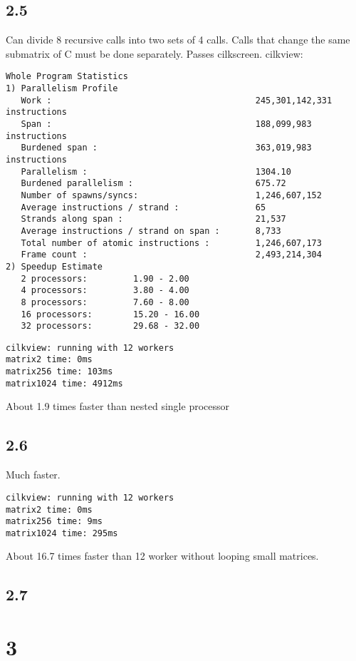\documentclass[12pt]{article}
\begin{document}
\subsection{2.5}
Can divide 8 recursive calls into two sets of 4 calls.  Calls that change the 
same submatrix of C must be done separately.  
Passes cilkscreen.  
cilkview: 
\begin{verbatim}
Whole Program Statistics
1) Parallelism Profile
   Work :                                        245,301,142,331 instructions
   Span :                                        188,099,983 instructions
   Burdened span :                               363,019,983 instructions
   Parallelism :                                 1304.10
   Burdened parallelism :                        675.72
   Number of spawns/syncs:                       1,246,607,152
   Average instructions / strand :               65
   Strands along span :                          21,537
   Average instructions / strand on span :       8,733
   Total number of atomic instructions :         1,246,607,173
   Frame count :                                 2,493,214,304
2) Speedup Estimate
   2 processors:         1.90 - 2.00
   4 processors:         3.80 - 4.00
   8 processors:         7.60 - 8.00
   16 processors:        15.20 - 16.00
   32 processors:        29.68 - 32.00
\end{verbatim}
\begin{verbatim}
cilkview: running with 12 workers
matrix2 time: 0ms
matrix256 time: 103ms
matrix1024 time: 4912ms
\end{verbatim}
About 1.9 times faster than nested single processor

\subsection{2.6}
Much faster.  
\begin{verbatim}
cilkview: running with 12 workers
matrix2 time: 0ms
matrix256 time: 9ms
matrix1024 time: 295ms
\end{verbatim}
About 16.7 times faster than 12 worker without looping small matrices.  

\subsection{2.7}

\section{3}
\end{document}
